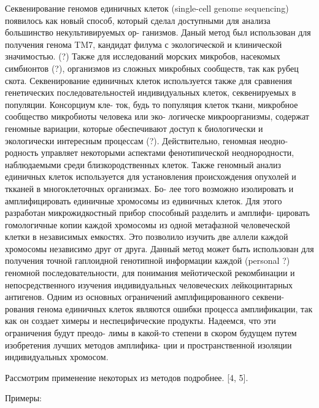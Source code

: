 Секвенирование геномов единичных клеток (single-cell genome sequencing) появилось как
новый способ, который сделал доступными для анализа большинство некультивируемых ор-
ганизмов. Даный метод был использован для получения генома TM7, кандидат филума с
экологической и клинической значимостью. (?) Также для исследований морских микробов,
насекомых симбионтов (?), организмов из сложных микробных сообществ, так как рубец
скота. Секвенирование единичных клеток используется также для сравнения генетических
последовательностей индивидуальных клеток, секвенируемых в популяции. Консорциум кле-
ток, будь то популяция клеток ткани, микробное сообщество микробиоты человека или эко-
логическе микроорганизмы, содержат геномные вариации, которые обеспечивают доступ к
биологически и экологически интересным процессам (?). Действительно, геномная неодно-
родность управляет некоторыми аспектами фенотипической неоднородности, наблюдаемыми
среди близкородственных клеток. Также геномный анализ единичных клеток используется
для установления происхождения опухолей и ткканей в многоклеточных организмах. Бо-
лее того возможно изолировать и амплифицировать единичные хромосомы из единичных
клеток. Для этого разработан микрожидкостный прибор способный разделить и амплифи-
цировать гомологичные копии каждой хромосомы из одной метафазной человеческой клетки
в независимых емкостях. Это позволило изучить две аллели каждой хромосомы независимо
друг от друга. Данный метод может быть использован для получения точной гаплоидной
генотипной информации каждой (personal ?) геномной последовательности, для понимания
мейотической рекомбинации и непосредственного изучения индивидуальных человеческих
лейкоцинтарных антигенов. Одним из основных ограничений амплфицированного секвени-
рования генома единичных клеток являются ошибки процесса амплификации, так как он
создает химеры и неспецифические продукты. Надеемся, что эти ограничения будут преодо-
лимы в какой-то степени в скором будущем путем изобретения лучших методов амплифика-
ции и пространственной изоляции индивидуальных хромосом.

Рассмотрим применение некоторых из методов подробнее. [4, 5].

Примеры:

